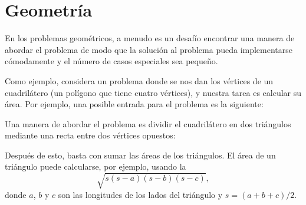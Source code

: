 \chapter{Geometría}


En los problemas geométricos, a menudo es un desafío
encontrar una manera de abordar el problema de modo que
la solución al problema pueda implementarse cómodamente
y el número de casos especiales sea pequeño.

Como ejemplo, considera un problema donde
se nos dan los vértices de un cuadrilátero
(un polígono que tiene cuatro vértices),
y nuestra tarea es calcular su área.
Por ejemplo, una posible entrada para el problema es la siguiente:

\begin{center}
\end{center}
Una manera de abordar el problema es dividir
el cuadrilátero en dos triángulos mediante una recta
entre dos vértices opuestos:
\begin{center}
\end{center}
Después de esto, basta con sumar las áreas
de los triángulos.
El área de un triángulo puede calcularse,
por ejemplo, usando la 
\[ \sqrt{s (s-a) (s-b) (s-c)},\]
donde $a$, $b$ y $c$ son las longitudes
de los lados del triángulo y
$s=(a+b+c)/2$.


